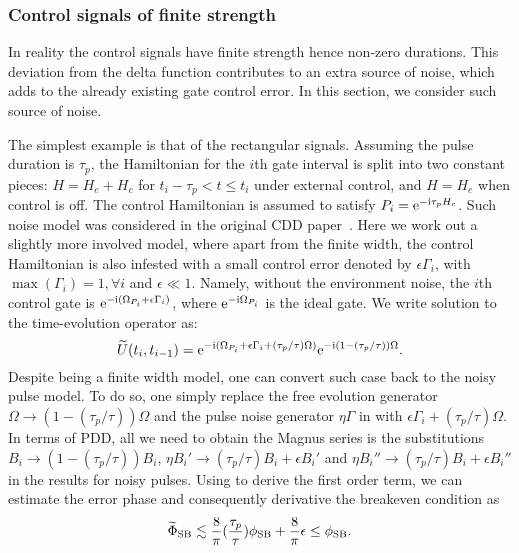 \documentclass[pra,reprint,superscriptaddress]{revtex4-2}
\newcommand{\wt}[1]{\widetilde{#1}}
\begin{document}
\subsubsection{Control signals of finite strength}
In reality the control signals have finite strength hence non-zero durations.
This deviation from the delta function contributes to an extra source of noise, which adds to the already existing gate control error. 
 In this section, we consider such source of noise. 


The simplest example is that of the rectangular signals. Assuming the pulse duration is $\tau_p$, the Hamiltonian  for the $i$th gate interval is split into two constant pieces: $H=H_e+H_c$ for $t_i -\tau_p  < t \le t_{i}$ under external control, and $H=H_e$ when control is off. The control Hamiltonian is assumed to satisfy $P_i = \mathrm{e}^{-\mathrm{i} \tau_p H_c }$.
Such noise model was considered in the original CDD paper~\!\cite{khodjasteh2007performance}. 
Here we work out a slightly more involved model, where apart from the finite width, the control Hamiltonian is also infested with a small control error denoted by $\epsilon\Gamma_i$, with $\max{(\Gamma_i)}=1, \forall i$ and $\epsilon\ll 1$.  Namely, without the environment noise, the $i$th control gate
is $ \mathrm{e}^{-\mathrm{i} (\Omega_{P_i} +\epsilon \Gamma_i)}$, where $\mathrm{e}^{-\mathrm{i} \Omega_{P_i} }$ is the ideal gate. 
We write solution to the time-evolution operator as:
\begin{equation}
 \wt U(t_{i},t_{i-1}) =  \upe^{-\upi (\Omega_{P_i} +\epsilon \Gamma_i+
 (\tau_p/\tau) \Omega)}  \upe^{-\upi (1-(\tau_p/\tau)) \Omega}.
\end{equation}
Despite being a finite width model, one can convert such case back to the noisy pulse model.
To do so, one simply replace the free evolution generator $\Omega\to (1-(\tau_p/\tau)) \Omega$ and the pulse noise generator $\eta\Gamma$  in  with $\epsilon \Gamma_i + (\tau_p/\tau) \Omega$.
In terms of PDD, all we need to obtain the Magnus series is the substitutions $B_i \to (1-(\tau_p/\tau)) B_i$, $\eta B_i' \to (\tau_p/\tau) B_i + \epsilon B_i'$ and $\eta B_i'' \to (\tau_p/\tau) B_i + \epsilon B_i''$ in the results for noisy pulses. Using  to derive the first order term, we can estimate the error phase and consequently derivative the breakeven condition as
\begin{equation}\label{eq:PDD-rect1}
\wt\Phi_{\rSB}\lesssim \frac{8}{\pi} (\frac{\tau_p}{\tau})\phi_\rSB +  \frac{8}{\pi} \epsilon\le\phi_\rSB.
\end{equation}
\end{document}
